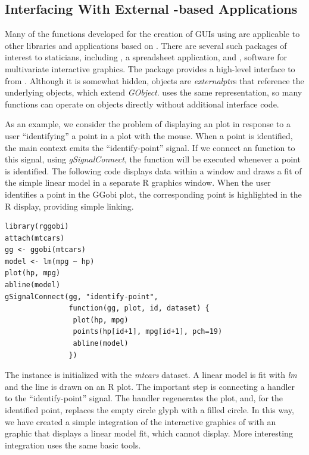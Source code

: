\documentclass[article]{jss}
\begin{document}
\subsection[Interfacing With External GObject-based
Applications]{Interfacing With External -based
Applications}

Many of the  functions developed for the creation of GUIs
using  are applicable to other libraries and applications
based on . There are several such packages of interest to
staticians, including , a spreadsheet application, and
, software for multivariate interactive graphics. The
 package \citep{rggobi} provides a high-level interface to
 from . Although it is somewhat hidden,
 objects are \emph{externalptr}s that reference the
underlying  objects, which extend
\emph{GObject}.  uses the same  representation,
so many  functions can operate on  objects
directly without additional interface code.

As an example, we consider the problem of displaying an 
plot in
response to a user ``identifying'' a point in a  plot with
the mouse.
When a  point is identified, the main  context
emits
the ``identify-point'' signal. If we connect an  function
to
this signal, using \emph{gSignalConnect}, the function will be
executed whenever a point is identified. 
The following code displays data within a  window and
draws a fit of the simple linear model in a separate R graphics window.
When the user identifies a point in the GGobi plot, the corresponding
point is highlighted in the R display, providing simple linking.
\begin{verbatim}
library(rggobi)
attach(mtcars)
gg <- ggobi(mtcars)
model <- lm(mpg ~ hp)
plot(hp, mpg)
abline(model)
gSignalConnect(gg, "identify-point", 
               function(gg, plot, id, dataset) {
                plot(hp, mpg)
                points(hp[id+1], mpg[id+1], pch=19)
                abline(model)
               })
\end{verbatim}
The  instance is initialized with the \emph{mtcars} dataset.  A
linear model is fit with \emph{lm} and the line is drawn on an R
plot. The important step is connecting a handler to the
``identify-point'' signal. The handler regenerates the 
plot, and, for the identified point, replaces the empty circle glyph
with a filled circle.  In this way, we have created a simple
integration of the interactive
graphics of  with an  graphic that displays a
linear model fit, which  cannot display. More interesting
integration uses the same basic tools.
\end{document}
